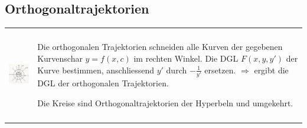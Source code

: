 \subsection{Orthogonaltrajektorien}
\begin{tabular}{ll}
\parbox{4.5cm}{
\includegraphics[height=4cm]{./bilder/orthoTrajekt.png}
}
& \parbox{14.5cm}{
Die orthogonalen Trajektorien schneiden alle Kurven der gegebenen Kurvenschar
$y=f(x,c)$ im rechten Winkel.\\
Die DGL $F(x,y,y')$ der Kurve bestimmen, anschliessend $y'$ durch
$-\frac{1}{y'}$ ersetzen.\\
$\Rightarrow$ ergibt die DGL der orthogonalen Trajektorien.\\
 \\
Die Kreise sind Orthogonaltrajektorien der Hyperbeln und umgekehrt.
}
\end{tabular}
